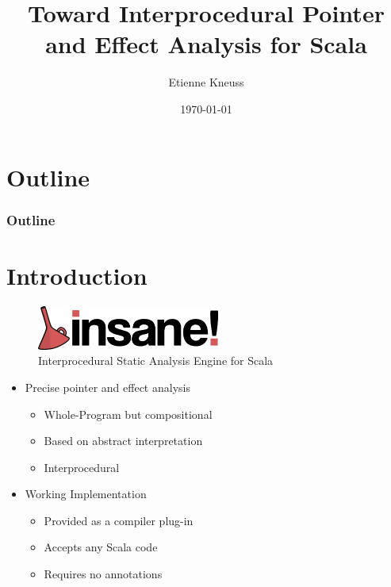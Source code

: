 \documentclass[hyperref={pdfpagelabels=false}]{beamer}
\begin{document}
\title{Toward Interprocedural Pointer and Effect Analysis for Scala}
\author{Etienne Kneuss}
\date{\today}


\begin{frame}
    \titlepage
\end{frame}

\section*{Outline}
\begin{frame}
    \frametitle{Outline}
    \tableofcontents
\end{frame}

\section{Introduction}

\begin{frame}[label=overview]
    \begin{figure}[t]
        \includegraphics[width=60mm]{../../logo.png}\\
        Interprocedural Static Analysis Engine for Scala
    \end{figure}

    \begin{itemize}
        \item Precise pointer and effect analysis
            \begin{itemize}
                \item Whole-Program but compositional
                \item Based on abstract interpretation
                \item Interprocedural
            \end{itemize}
        \item Working Implementation
            \begin{itemize}
                \item Provided as a compiler plug-in
                \item Accepts any Scala code
                \item Requires no annotations
            \end{itemize}
    \end{itemize}
\end{frame}
\end{document}
